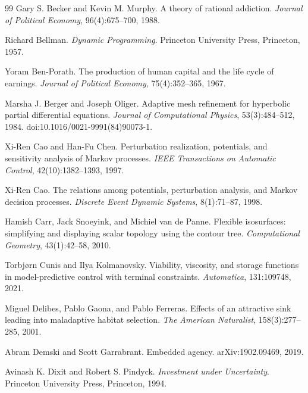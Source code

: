 \documentclass[11pt,a4paper]{article}
\theoremstyle{remark}
\begin{document}
\begin{thebibliography}{99}
Gary S. Becker and Kevin M. Murphy.
\newblock A theory of rational addiction.
\newblock \emph{Journal of Political Economy}, 96(4):675--700, 1988.

Richard Bellman.
\newblock \emph{Dynamic Programming}.
\newblock Princeton University Press, Princeton, 1957.

Yoram Ben-Porath.
\newblock The production of human capital and the life cycle of earnings.
\newblock \emph{Journal of Political Economy}, 75(4):352--365, 1967.

Marsha J. Berger and Joseph Oliger.
\newblock Adaptive mesh refinement for hyperbolic partial differential equations.
\newblock \emph{Journal of Computational Physics}, 53(3):484--512, 1984.
\newblock doi:10.1016/0021-9991(84)90073-1.

Xi-Ren Cao and Han-Fu Chen.
\newblock Perturbation realization, potentials, and sensitivity analysis of Markov processes.
\newblock \emph{IEEE Transactions on Automatic Control}, 42(10):1382--1393, 1997.

Xi-Ren Cao.
\newblock The relations among potentials, perturbation analysis, and Markov decision processes.
\newblock \emph{Discrete Event Dynamic Systems}, 8(1):71--87, 1998.

Hamish Carr, Jack Snoeyink, and Michiel van de Panne.
\newblock Flexible isosurfaces: simplifying and displaying scalar topology using the contour tree.
\newblock \emph{Computational Geometry}, 43(1):42--58, 2010.

Torbj\o rn Cunis and Ilya Kolmanovsky.
\newblock Viability, viscosity, and storage functions in model-predictive control with terminal constraints.
\newblock \emph{Automatica}, 131:109748, 2021.

Miguel Delibes, Pablo Gaona, and Pablo Ferreras.
\newblock Effects of an attractive sink leading into maladaptive habitat selection.
\newblock \emph{The American Naturalist}, 158(3):277--285, 2001.

Abram Demski and Scott Garrabrant.
\newblock Embedded agency.
\newblock arXiv:1902.09469, 2019.

Avinash K. Dixit and Robert S. Pindyck.
\newblock \emph{Investment under Uncertainty}.
\newblock Princeton University Press, Princeton, 1994.


\end{thebibliography}
\end{document}
